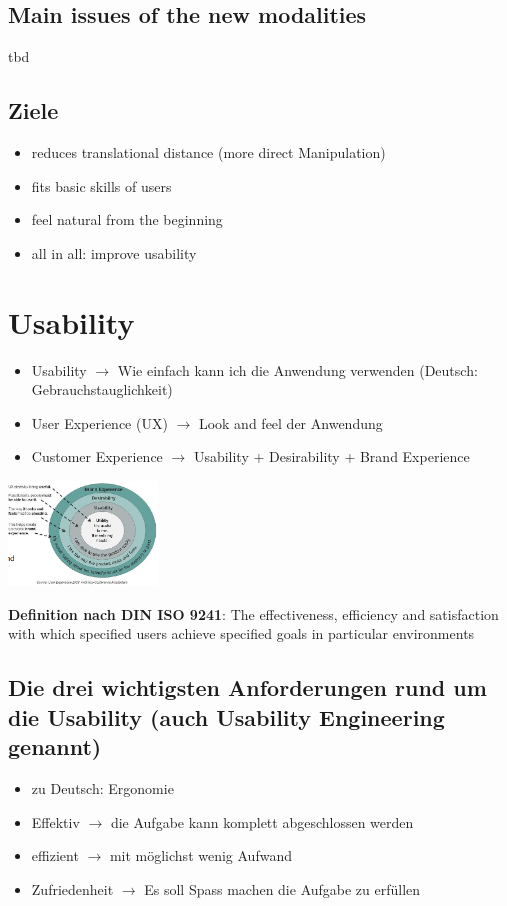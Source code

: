 \documentclass{report}
\newenvironment{Figure}
	{\par\medskip\noindent\minipage{\linewidth}}
	{\endminipage\par\medskip}
\theoremstyle{definition}
\theoremstyle{example}
\begin{document}
   \subsection{Main issues of the new modalities}
   tbd

   \subsection{Ziele}
\begin{itemize}
   \item reduces translational distance (more direct Manipulation)
   \item fits basic skills of users
   \item feel natural from the beginning
   \item all in all: improve usability
\end{itemize}

\section*{Usability}
\begin{itemize}
   \item Usability $\rightarrow$ Wie einfach kann ich die Anwendung verwenden (Deutsch: Gebrauchstauglichkeit)
   \item User Experience (UX) $\rightarrow$ Look and feel der Anwendung 
   \item Customer Experience $\rightarrow$ Usability + Desirability + Brand Experience
\end{itemize}
\begin{Figure}
   \centering
    \includegraphics[width=150px]{img/Usability.png}
        \label{fig:Usability}
\end{Figure}

\textbf{Definition nach DIN ISO 9241}: The effectiveness, efficiency and satisfaction with which specified users achieve specified goals in particular environments

\subsection{Die drei wichtigsten Anforderungen rund um die Usability (auch Usability Engineering genannt)}
\begin{itemize}
   \item zu Deutsch: Ergonomie
   \item Effektiv $\rightarrow$ die Aufgabe kann komplett abgeschlossen werden
   \item effizient $\rightarrow$ mit möglichst wenig Aufwand
   \item Zufriedenheit $\rightarrow$ Es soll Spass machen die Aufgabe zu erfüllen
\end{itemize}
\end{document}
